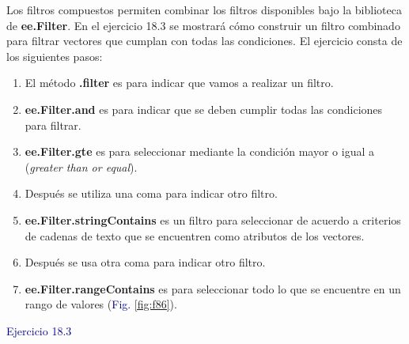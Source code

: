 \documentclass[
  12pt,
  letterpaper,
  twoside]{book}
\providecommand{\tightlist}{%
  \setlength{\itemsep}{0pt}\setlength{\parskip}{0pt}}
\newcommand\boldpurple[1]{\textcolor{darkpurple}{\textbf{#1}}}
\begin{document}
Los filtros compuestos permiten combinar los filtros disponibles bajo la biblioteca de \boldpurple{ee.Filter}. En el ejercicio 18.3 se mostrará cómo construir un filtro combinado para filtrar vectores que cumplan con todas las condiciones. El ejercicio consta de los siguientes pasos:

\begin{enumerate}
\def\labelenumi{\arabic{enumi}.}
\tightlist
\item
  El método \boldpurple{.filter} es para indicar que vamos a realizar un filtro.
\item
  \boldpurple{ee.Filter.and} es para indicar que se deben cumplir todas las condiciones para filtrar.
\item
  \boldpurple{ee.Filter.gte} es para seleccionar mediante la condición mayor o igual a (\emph{greater than or equal}).
\item
  Después se utiliza una coma para indicar otro filtro.
\item
  \boldpurple{ee.Filter.stringContains} es un filtro para seleccionar de acuerdo a criterios de cadenas de texto que se encuentren como atributos de los vectores.
\item
  Después se usa otra coma para indicar otro filtro.
\item
  \boldpurple{ee.Filter.rangeContains} es para seleccionar todo lo que se encuentre en un rango de valores (\textcolor{darkblue}{Fig.} \ref{fig:f86}).
\end{enumerate}

\textcolor{darkblue}{Ejercicio 18.3}
\end{document}
